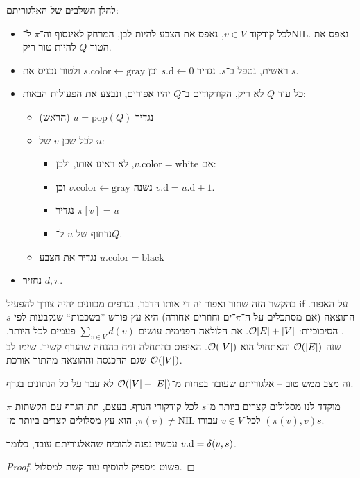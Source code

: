 \documentclass[]{../../../../tex/classes/styledArticle}
\begin{document}
	להלן השלבים של האלגוריתם: 
	\begin{itemize}
		\item לכל קודקוד $v \in V$, נאפס את הצבע להיות לבן, המרחק לאינסוף וה־$\pi$ ל־NIL. נאפס את הטור $Q$ להיות טור ריק. 
		\item ראשית, נטפל ב־$s$. נגדיר $s.\mathrm{d} \gets 0$ וכן $s.\mathrm{color} \gets \mathrm{gray}$ ולטור נכניס את $s$.
		\item כל עוד $Q$ לא ריק, הקודקודים ב־$Q$ יהיו אפורים, ונבצע את הפעולות הבאות: 
		\begin{itemize}
			\item נגדיר $u = \mathrm{pop}(Q)$ (הראש)
			\item לכל שכן $v$ של $u$: 
			\begin{itemize}
				\item אם $v.\mathrm{color} = \mathrm{white}$, לא ראינו אותו, ולכן: 
				\item נשנה $v.\mathrm{color} \gets \mathrm{gray}$ וכן $v.\mathrm{d} = u.\mathrm{d} + 1$. 
				\item נגדיר $\pi[v] = u$
				\item נדחוף של $u$ ל־$Q$. 
			\end{itemize}
			\item נגדיר את הצבע $u.\mathrm{color} = \mathrm{black}$
		\end{itemize}
		\item נחזיר $d, \pi$. 
	\end{itemize}
	
	בהקשר הזה שחור ואפור זה די אותו הדבר, בגרפים מכוונים יהיה צורך להפעיל if על האפור. התוצאה (אם מסתכלים על ה־$\pi$־ים וחוזרים אחורה) היא עץ פורש ''בשכבות`` שנקבעות לפי $s$. הסיבוכיות: $\mathcal{O}{\left \lvert E \right \rvert + \left \lvert V \right \rvert}$. את הלולאה הפנימית עושים $\sum_{v \in V}d(v)$ פעמים לכל היותר, שזה $\mathcal{O}(\left \lvert E \right \rvert)$ והאתחול הוא $\mathcal{O}(\left \lvert V \right \rvert)$. האיפוס בהתחלה זניח בהנחה שהגרף קשיר. שימו לב שגם ההכנסה וההוצאה מהתור אורכת $\mathcal{O}(\left \lvert V \right \rvert)$. 
	
	זה מצב ממש טוב – אלגוריתם שעובד בפחות מ־$\mathcal{O}(\left \lvert V \right \rvert + \left \lvert E \right \rvert)$ לא עבר על כל הנתונים בגרף. 
	
	$\pi$ מוקדד לנו מסלולים קצרים ביותר מ־$s$ לכל קודקודי הגרף. בעצם, תת־הגרף עם הקשתות $(\pi(v), v)$ לכל $v \in V$ עבורו $\pi(v) \neq \text{NIL}$, הוא עץ מסלולים קצרים ביותר מ־$s$. 
	
	עכשיו נפנה להוכיח שהאלגוריתם עובד, כלומר $v.\mathrm{d} = \delta(v, s)$. 
	
	\begin{proof}
		פשוט מספיק להוסיף עוד קשת למסלול. 
	\end{proof}
	
\end{document}
